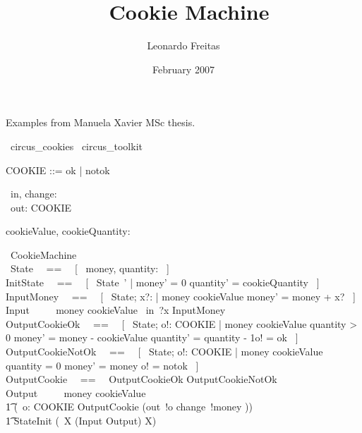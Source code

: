 \documentclass{article}
\begin{document}
\title{\Circus\ Cookie Machine}
\author{Leonardo Freitas}
\date{February 2007}

\maketitle

Examples from Manuela Xavier MSc thesis.

\begin{zsection}
  \SECTION\ circus\_cookies \parents\ circus\_toolkit
\end{zsection}

\begin{zed}
   COOKIE ::= ok | notok
\end{zed}

\begin{circus}
   \circchannel\ in, change: \nat \\
   \circchannel\ out: COOKIE
\end{circus}

\begin{axdef}
   cookieValue, cookieQuantity: \nat
\end{axdef}

\begin{circus}
    \circprocess\ CookieMachine \circdef \circbegin \\
    \circstate\ State ~~==~~ [~ money, quantity: \nat ~]  \\
    InitState ~~==~~ [~ State~' | money' = 0 \land quantity' = cookieQuantity ~] \\
    InputMoney ~~==~~ [~ \Delta State; x?: \nat | money \leq cookieValue \land money' = money + x? ~] \\
    Input ~~\circdef~~ \lcircguard money \leq cookieValue \rcircguard  \circguard\ in~?x \then InputMoney \\
    OutputCookieOk ~~==~~ [~ \Delta State; o!: COOKIE | money \geq cookieValue \land
        quantity > 0 \land money' = money - cookieValue \land quantity' = quantity - 1\land o! = ok ~] \\
    OutputCookieNotOk ~~==~~ [~ \Delta State; o!: COOKIE | money \geq cookieValue \land
        quantity = 0 \land money' = money \land o! = notok ~] \\
    OutputCookie ~~==~~ OutputCookieOk \lor OutputCookieNotOk \\
    Output ~~\circdef~~ \lcircguard money \geq cookieValue \rcircguard \circguard\ \\
        \t1 (\circvar\ o: COOKIE \circspot OutputCookie \circseq (out~!o \then change~!money \then \Skip)) \\
    \t1 \circspot StateInit \circseq (\circmu\ X \circspot (Input \extchoice Output) \circseq X) \\
   \circend
\end{circus}
\end{document}
